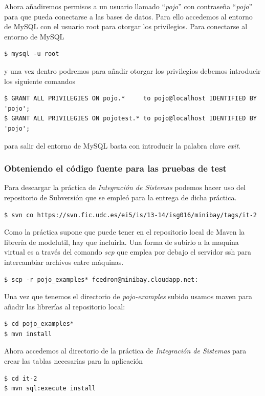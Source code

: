 \documentclass{article}
\begin{document}
	Ahora añadiremos permisos a un usuario llamado ``\emph{pojo}'' con contraseña ``\emph{pojo}'' para que pueda conectarse a las bases de datos. Para ello accedemos al entorno de MySQL con el usuario root para otorgar los privilegios.
	Para conectarse al entorno de MySQL
\begin{lstlisting}[style=miniBash]
$ mysql -u root 
\end{lstlisting}	
y una vez dentro podremos para añadir otorgar los privilegios debemos introducir los siguiente comandos
\begin{lstlisting}[style=miniBash]
$ GRANT ALL PRIVILEGIES ON pojo.*     to pojo@localhost IDENTIFIED BY 'pojo';
$ GRANT ALL PRIVILEGIES ON pojotest.* to pojo@localhost IDENTIFIED BY 'pojo';
\end{lstlisting}
para salir del entorno de MySQL basta con introducir la palabra clave \emph{exit}.

\subsubsection{Obteniendo el código fuente para las pruebas de test}
	Para descargar la práctica de \emph{Integración de Sistemas} podemos hacer uso del repositorio de Subversión que se empleó para la entrega de dicha práctica.
\begin{lstlisting}[style=miniBash]
$ svn co https://svn.fic.udc.es/ei5/is/13-14/isg016/minibay/tags/it-2
\end{lstlisting}	

	Como la práctica supone que puede tener en el repositorio local de Maven la librería de modelutil, hay que incluirla. Una forma de subirlo a la maquina virtual es a través del comando \emph{scp} que emplea por debajo el servidor ssh para intercambiar archivos entre máquinas.
\begin{lstlisting}[style=miniBash]
$ scp -r pojo_examples* fcedron@minibay.cloudapp.net:
\end{lstlisting}	

	Una vez que tenemos el directorio de \emph{pojo-examples} subido usamos maven para añadir las librerías al repositorio local:
\begin{lstlisting}[style=miniBash]
$ cd pojo_examples* 
$ mvn install
\end{lstlisting}	

	Ahora accedemos al directorio de la práctica de \emph{Integración de Sistemas} para crear las tablas necesarias para la aplicación
\begin{lstlisting}[style=miniBash]
$ cd it-2
$ mvn sql:execute install
\end{lstlisting}	
\end{document}
